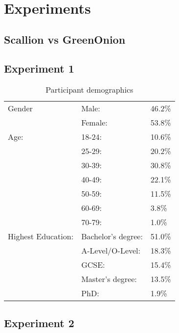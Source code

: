 \chapter{Experiments}
\label{cha:Experiments}

\section{Scallion vs GreenOnion}

\section{Experiment 1}


\begin{table}[h!]
    \centering
    \begin{tabular}{|l|ll|}
        \hline
        Gender & Male: & 46.2\% \\
               & Female: & 53.8\% \\
        \hline
        Age:   & 18-24: & 10.6\% \\ 
               & 25-29: & 20.2\% \\ 
               & 30-39: & 30.8\% \\ 
               & 40-49: & 22.1\% \\ 
               & 50-59: & 11.5\% \\ 
               & 60-69: & 3.8\% \\ 
               & 70-79: & 1.0\% \\ 
               
        \hline
        Highest Education:  & Bachelor's degree:    & 51.0\% \\
                            & A-Level/O-Level:      & 18.3\% \\
                            & GCSE:                 & 15.4\%  \\
                            & Master's degree:      & 13.5\% \\ 
                            & PhD:                  & 1.9\% \\
        \hline

    \end{tabular}
    \caption{Participant demographics}
    \label{}
\end{table}



\section{Experiment 2}
